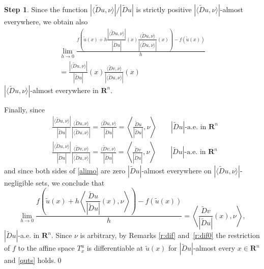 \documentclass[manuscript, printscheme]{aomart}
\newtheorem[{}\it]{thm}{Theorem}[section]
\theoremstyle{definition}
\newtheorem*[{}\it]{notation}{Notation}
\newtheorem{step}{Step}
\newcommand{\wt}{\widetilde}
\newcommand{\envert}[1]{\left\lvert#1\right\rvert}
\let\abs=\envert
\begin{document}
\begin{step}
Since the function $\abs{\langle \wt{D}u,\nu\rangle }/\abs{\wt{D}u}$
is strictly positive $\abs{\langle \wt{D}u,\nu\rangle }$-almost everywhere,
we obtain also
\begin{multline*}
\lim_{h\to 0}\frac{f(\tilde u(x)+h\dfrac{\abs{\langle
\wt{D}u,\nu\rangle }}{\abs{\wt{D}u}}(x)\dfrac{\langle \wt{D}
u,\nu\rangle }{\abs{\langle \wt{D}u,\nu\rangle }}(x))-f(\tilde u(x))}{h}\\
=\frac{\abs{\langle \wt{D}u,\nu\rangle }}{\abs{\wt{D}u}}(x)\frac
{\langle \wt{D}v,\nu\rangle }{\abs{\langle
\wt{D}u,\nu\rangle }}(x)
\end{multline*}
$\abs{\langle \wt{D}u,\nu\rangle }$-almost everywhere in $\mathbf{R}^n$.

Finally, since
\begin{align*}
&\frac{\abs{\langle \wt{D}u,\nu\rangle }}{\abs{\wt{D}u}}
\frac{\langle \wt{D}u,\nu\rangle }{\abs{\langle \wt{D}u,\nu\rangle}}
=\frac{\langle \wt{D}u,\nu\rangle }{\abs{\wt{D}u}}
=\left\langle \frac{\wt{D}u}{\abs{\wt{D}u}},\nu\right\rangle
        \qquad\abs{\wt{D}u}\text{-a.e. in }\mathbf{R}^n\\
&\frac{\abs{\langle \wt{D}u,\nu\rangle }}{\abs{\wt{D}u}}
\frac{\langle \wt{D}v,\nu\rangle }{\abs{\langle \wt{D}u,\nu\rangle}}
=\frac{\langle \wt{D}v,\nu\rangle }{\abs{\wt{D}u}}
=\left\langle \frac{\wt{D}v}{\abs{\wt{D}u}},\nu\right\rangle
        \qquad\abs{\wt{D}u}\text{-a.e. in }\mathbf{R}^n
\end{align*}
and since both sides of \eqref{alimo}
are zero $\abs{\wt{D}u}$-almost everywhere
on $\abs{\langle \wt{D}u,\nu\rangle }$-negligible sets, we conclude that
\[
\lim_{h\to 0}\frac{f\left(
\tilde u(x)+h\left\langle \dfrac{\wt{D}
u}{\abs{\wt{D}u}}(x),\nu\right\rangle \right)-f(\tilde u(x))}h
=\left\langle \frac{\wt{D}v}{\abs{\wt{D}u}}(x),\nu\right\rangle,
\]
$\abs{\wt{D}u}$-a.e. in $\mathbf{R}^n$.
Since $\nu$ is arbitrary, by Remarks \ref{r:dif} and~\ref{r:dif0}
the restriction of $f$ to
the affine space $T^u_x$ is differentiable at $\tilde u(x)$ for $\abs{\wt{D}
u}$-almost every $x\in \mathbf{R}^n$ and \eqref{quts} holds.\qed
\end{step}
\end{document}
